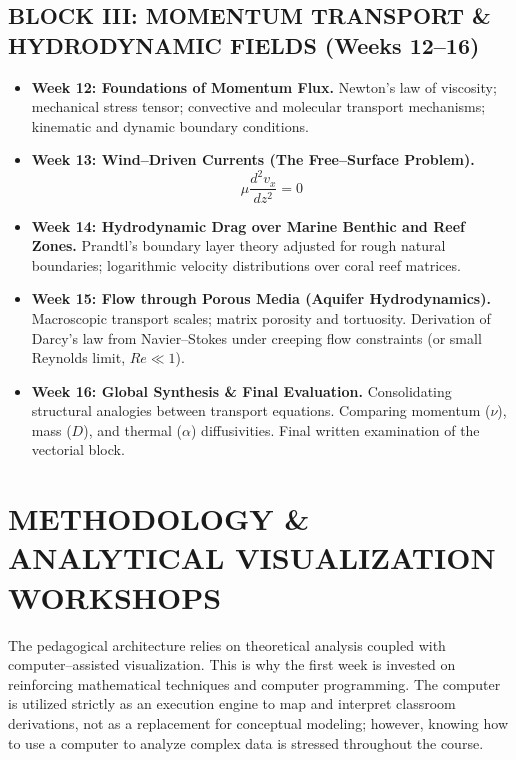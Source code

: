 \subsection{BLOCK III: MOMENTUM TRANSPORT \& HYDRODYNAMIC FIELDS (Weeks 12–16)}
\begin{itemize}
    \item \textbf{Week 12: Foundations of Momentum Flux.} Newton's law of viscosity; mechanical stress tensor; convective and molecular transport mechanisms; kinematic and dynamic boundary conditions.
    \item \textbf{Week 13: Wind--Driven Currents (The Free--Surface Problem).}
    \begin{equation*}
        \mu \frac{d^2 v_x}{dz^2} = 0
    \end{equation*}
    \item \textbf{Week 14: Hydrodynamic Drag over Marine Benthic and Reef Zones.} Prandtl's boundary layer theory adjusted for rough natural boundaries; logarithmic velocity distributions over coral reef matrices.
    \item \textbf{Week 15: Flow through Porous Media (Aquifer Hydrodynamics).} Macroscopic transport scales; matrix porosity and tortuosity. Derivation of Darcy's law from Navier--Stokes under creeping flow constraints (or small Reynolds limit, $Re \ll 1$).
    \item \textbf{Week 16: Global Synthesis \& Final Evaluation.} Consolidating structural analogies between transport equations. Comparing momentum ($\nu$), mass ($D$), and thermal ($\alpha$) diffusivities. Final written examination of the vectorial block.
\end{itemize}

\section{METHODOLOGY \& ANALYTICAL VISUALIZATION WORKSHOPS}
The pedagogical architecture relies on {theoretical analysis} coupled with {computer--assisted visualization}. This is why the first week is invested on reinforcing mathematical techniques and computer programming. The computer is utilized strictly as an execution engine to map and interpret classroom derivations, not as a replacement for conceptual modeling; however, knowing how to use a computer to analyze complex data is stressed throughout the course.

